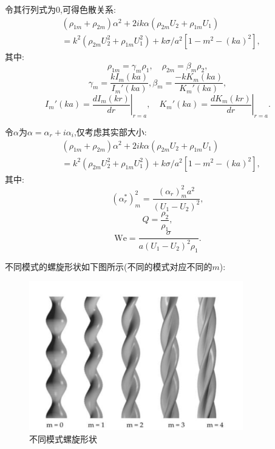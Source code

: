 \documentclass[UTF8]{gapd}
\begin{document}
令其行列式为0,可得色散关系:
\begin{equation}
\begin{split}
&\left(\rho_{1 m}+\rho_{2 m}\right) \alpha^{2}+2 i k \alpha\left(\rho_{2 m} U_{2}+\rho_{1 m} U_{1}\right)\\
&=k^{2}\left(\rho_{2 m} U_{2}^{2}+\rho_{1 m} U_{1}^{2}\right)+k \sigma / a^{2}\left[1-m^{2}-(k a)^{2}\right],
\end{split}
\end{equation}
其中:
$$\rho_{1 m}=\gamma_{m} \rho_{1}, \quad \rho_{2 m}=\beta_{m} \rho_{2},$$
$$\gamma _m=\frac{kI_m( ka )}{ I_{m}'\left( ka \right)} ,\beta _m=\frac{-kK_m\left( ka \right)}{ K_{m}'\left( ka \right)}, $$
$$I_{m}'(k a)=\left.\frac{d I_{m}(k r)}{d r}\right|_{r=a}, \quad K_{m}'(k a)=\left.\frac{d K_{m}(k r)}{d r}\right|_{r=a}.$$

令$\alpha$为$\alpha =\alpha _r+i\alpha _i$,仅考虑其实部大小:
\begin{equation}
\begin{split}
&\left(\rho_{1 m}+\rho_{2 m}\right) \alpha^{2}+2 i k \alpha\left(\rho_{2 m} U_{2}+\rho_{1 m} U_{1}\right) 
\\&=k^{2}\left(\rho_{2 m} U_{2}^{2}+\rho_{1 m} U_{1}^{2}\right) 
+k \sigma / a^{2}\left[1-m^{2}-(k a)^{2}\right],
\end{split}
\end{equation}
其中:
$$ \left(\alpha_{r}^{*}\right)_{m}^{2} =\frac{\left(\alpha_{r}\right)_{m}^{2}a^2}{\left(U_{1}-U_{2}\right)^{2}},  $$
$$ Q=\frac{\rho_{2}}{\rho_{1}}, $$
$$ \mathrm{We} =\frac{\sigma}{a\left(U_{1}-U_{2}\right)^{2} \rho_{1}}.  $$


不同模式的螺旋形状如下图所示(不同的模式对应不同的$m$):
\begin{figure}[!htbp]%
	\centering
	\includegraphics[width=1\linewidth]{images/不同m对应的模式}
	\caption{不同模式螺旋形状\cite{c3}}
	\label{fig:P3}%
\end{figure}
\end{document}
